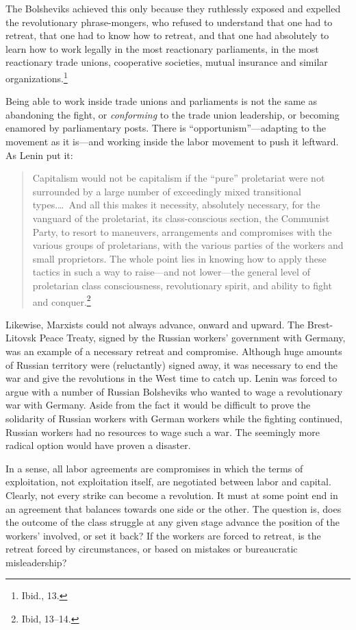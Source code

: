 The Bolsheviks achieved this only because they ruthlessly exposed and expelled the revolutionary phrase-mongers, who refused to understand that one had to retreat, that one had to know how to retreat, and that one had absolutely to learn how to work legally in the most reactionary parliaments, in the most reactionary trade unions, cooperative societies, mutual insurance and similar organizations.\footnote{Ibid., 13.}

Being able to work inside trade unions and parliaments is not the same as abandoning the fight, or \emph{conforming} to the trade union leadership, or becoming enamored by parliamentary posts. There is ``opportunism''---adapting to the movement as it is---and working inside the labor movement to push it leftward. As Lenin put it:

\blockquote{Capitalism would not be capitalism if the ``pure'' proletariat were not surrounded by a large number of exceedingly mixed transitional types.\ldots\ And all this makes it necessity, absolutely necessary, for the vanguard of the proletariat, its class-conscious section, the Communist Party, to resort to maneuvers, arrangements and compromises with the various groups of proletarians, with the various parties of the workers and small proprietors. The whole point lies in knowing how to apply these tactics in such a way to raise---and not lower---the general level of proletarian class consciousness, revolutionary spirit, and ability to fight and conquer.\footnote{Ibid, 13--14.}}

Likewise, Marxists could not always advance, onward and upward. The Brest-Litovsk Peace Treaty, signed by the Russian workers' government with Germany, was an example of a necessary retreat and compromise. Although huge amounts of Russian territory were (reluctantly) signed away, it was necessary to end the war and give the revolutions in the West time to catch up. Lenin was forced to argue with a number of Russian Bolsheviks who wanted to wage a revolutionary war with Germany. Aside from the fact it would be difficult to prove the solidarity of Russian workers with German workers while the fighting continued, Russian workers had no resources to wage such a war. The seemingly more radical option would have proven a disaster.

In a sense, all labor agreements are compromises in which the terms of exploitation, not exploitation itself, are negotiated between labor and capital. Clearly, not every strike can become a revolution. It must at some point end in an agreement that balances towards one side or the other. The question is, does the outcome of the class struggle at any given stage advance the position of the workers' involved, or set it back? If the workers are forced to retreat, is the retreat forced by circumstances, or based on mistakes or bureaucratic misleadership?


